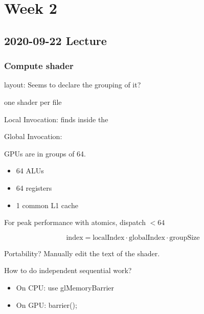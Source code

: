 \chapter{Week 2}

\section{2020-09-22 Lecture}

\subsection{Compute shader}

layout: Seems to declare the grouping of it?

one shader per file 

Local Invocation: finds inside the 

Global Invocation: 

GPUs are in groups of 64. 
\begin{itemize}
    \item 64 ALUs
    \item 64 registers
    \item 1 common L1 cache 
\end{itemize}

For peak performance with atomics, dispatch $< 64$

$$\text{index} = \text{localIndex} \cdot \text{globalIndex} \cdot \text{groupSize}$$

Portability? Manually edit the text of the shader.

How to do independent sequential work?
\begin{itemize}
    \item On CPU: use glMemoryBarrier
    \item On GPU: barrier();
\end{itemize} 